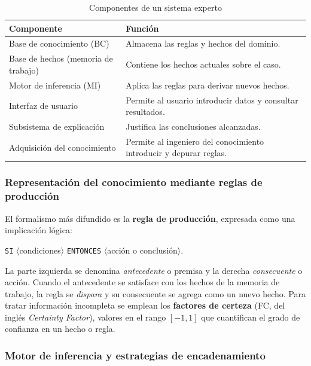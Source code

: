 \begin{table}[htbp]
	\caption{Componentes de un sistema experto}
	\label{tab:componentes}
	\centering
	\small
	\begin{tabular}{p{2.4cm}p{4.2cm}}
		\toprule
		\textbf{Componente} & \textbf{Funci\'on} \\
		\midrule
		Base de conocimiento (BC) & Almacena las reglas y hechos del dominio. \\
		Base de hechos (memoria de trabajo) & Contiene los hechos actuales sobre el caso. \\
		Motor de inferencia (MI) & Aplica las reglas para derivar nuevos hechos. \\
		Interfaz de usuario & Permite al usuario introducir datos y consultar resultados. \\
		Subsistema de explicaci\'on & Justifica las conclusiones alcanzadas. \\
		Adquisici\'on del conocimiento & Permite al ingeniero del conocimiento introducir y depurar reglas. \\
		\bottomrule
	\end{tabular}
\end{table}

\subsubsection{Representaci\'on del conocimiento mediante reglas de producci\'on}

El formalismo m\'as difundido es la \textbf{regla de producci\'on},
expresada como una implicaci\'on l\'ogica:

\begin{center}
	\texttt{SI} $\langle$condiciones$\rangle$ \texttt{ENTONCES}
	$\langle$acci\'on o conclusi\'on$\rangle$.
	\label{eq:regla}
\end{center}

La parte izquierda se denomina \emph{antecedente} o premisa y la derecha
\emph{consecuente} o acci\'on. Cuando el antecedente se satisface con los
hechos de la memoria de trabajo, la regla se \emph{dispara} y su
consecuente se agrega como un nuevo hecho. Para tratar informaci\'on
incompleta se emplean los \textbf{factores de certeza} (FC, del ingl\'es
\emph{Certainty Factor}), valores en el rango $[-1,1]$ que cuantifican el
grado de confianza en un hecho o regla.

\subsubsection{Motor de inferencia y estrategias de encadenamiento}

